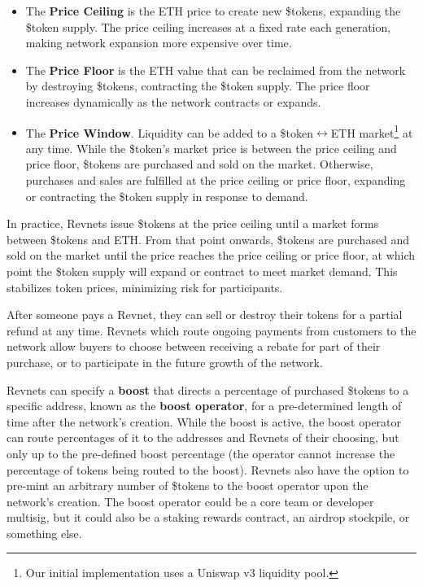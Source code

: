 \documentclass{article}
\begin{document}
\begin{itemize}
  \item The \textbf{Price Ceiling} is the ETH price to create new \$tokens, expanding the \$token supply. The price ceiling increases at a fixed rate each generation, making network expansion more expensive over time.
  \item The \textbf{Price Floor} is the ETH value that can be reclaimed from the network by destroying \$tokens, contracting the \$token supply. The price floor increases dynamically as the network contracts or expands.
  \item The \textbf{Price Window}. Liquidity can be added to a \$token$\leftrightarrow$ETH market\footnote{Our initial implementation uses a Uniswap v3 liquidity pool.} at any time. While the \$token's market price is between the price ceiling and price floor, \$tokens are purchased and sold on the market. Otherwise, purchases and sales are fulfilled at the price ceiling or price floor, expanding or contracting the \$token supply in response to demand.
\end{itemize}

In practice, Revnets issue \$tokens at the price ceiling until a market forms between \$tokens and ETH. From that point onwards, \$tokens are purchased and sold on the market until the price reaches the price ceiling or price floor, at which point the \$token supply will expand or contract to meet market demand. This stabilizes token prices, minimizing risk for participants.

After someone pays a Revnet, they can sell or destroy their tokens for a partial refund at any time. Revnets which route ongoing payments from customers to the network allow buyers to choose between receiving a rebate for part of their purchase, or to participate in the future growth of the network.

Revnets can specify a \textbf{boost} that directs a percentage of purchased \$tokens to a specific address, known as the \textbf{boost operator}, for a pre-determined length of time after the network's creation. While the boost is active, the boost operator can route percentages of it to the addresses and Revnets of their choosing, but only up to the pre-defined boost percentage (the operator cannot increase the percentage of tokens being routed to the boost). Revnets also have the option to pre-mint an arbitrary number of \$tokens to the boost operator upon the network's creation. The boost operator could be a core team or developer multisig, but it could also be a staking rewards contract, an airdrop stockpile, or something else. 
\end{document}
